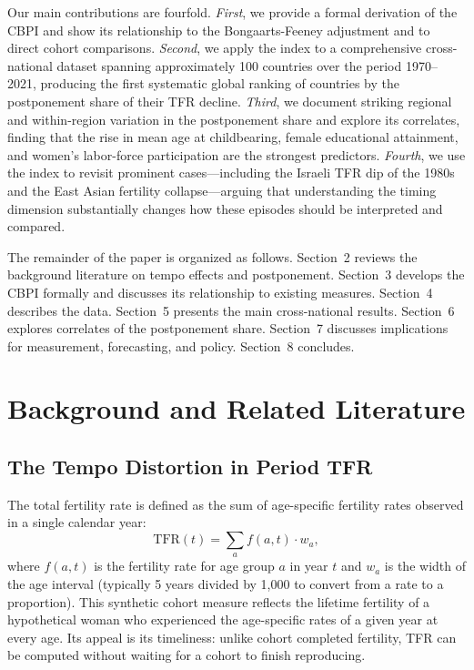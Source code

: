 \documentclass[12pt]{article}
\begin{document}
Our main contributions are fourfold.  \emph{First}, we provide a
formal derivation of the CBPI and show its relationship to the
Bongaarts-Feeney adjustment and to direct cohort comparisons.
\emph{Second}, we apply the index to a comprehensive cross-national
dataset spanning approximately 100 countries over the period
1970--2021, producing the first systematic global ranking of countries
by the postponement share of their TFR decline.  \emph{Third}, we
document striking regional and within-region variation in the
postponement share and explore its correlates, finding that the rise in
mean age at childbearing, female educational attainment, and women's
labor-force participation are the strongest predictors.  \emph{Fourth},
we use the index to revisit prominent cases---including the Israeli TFR
dip of the 1980s and the East Asian fertility collapse---arguing that
understanding the timing dimension substantially changes how these
episodes should be interpreted and compared.

The remainder of the paper is organized as follows.  Section~2 reviews
the background literature on tempo effects and postponement.
Section~3 develops the CBPI formally and discusses its relationship to
existing measures.  Section~4 describes the data.  Section~5 presents
the main cross-national results.  Section~6 explores correlates of
the postponement share.  Section~7 discusses implications for
measurement, forecasting, and policy.  Section~8 concludes.

\section{Background and Related Literature}
\label{sec:background}

\subsection{The Tempo Distortion in Period TFR}

The total fertility rate is defined as the sum of age-specific fertility
rates observed in a single calendar year:
\begin{equation}
    \mathrm{TFR}(t) = \sum_{a} f(a,t) \cdot w_a,
    \label{eq:TFR}
\end{equation}
where $f(a,t)$ is the fertility rate for age group $a$ in year $t$ and
$w_a$ is the width of the age interval (typically 5 years divided by
1{,}000 to convert from a rate to a proportion).  This synthetic
cohort measure reflects the lifetime fertility of a hypothetical woman
who experienced the age-specific rates of a given year at every age.
Its appeal is its timeliness: unlike cohort completed fertility, TFR
can be computed without waiting for a cohort to finish reproducing.
\end{document}
